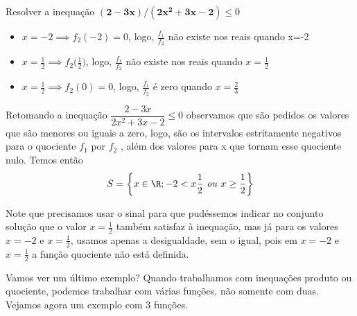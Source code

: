 \begin{example}{Resolver a inequação $\bm{(2-3x)/(2x^2+3x-2)}\leq0$}
\begin{itemize}
\item $x=-2\implies f_2(-2)=0$, logo, $\frac{f_1}{f_2}$ não existe nos reais quando x=-2
\item $x=\frac{1}{2}\implies f_2\big(\frac{1}{2}\big)$, logo, $\frac{f_1}{f_2}$ não existe nos reais quando $x=\frac{1}{2}$
\item $x=\frac{1}{2}\implies f_2(0) = 0$, logo, $\frac{f_1}{f_2}$ é zero quando $x=\frac{2}{3}$
\end{itemize}

Retomando a inequação $\dfrac{2-3x}{2x^2+3x-2}\leq 0$ observamos que são pedidos os valores que são menores ou iguais a zero, logo, são os intervalos estritamente negativos para o quociente $f_1$ por $f_2$  , além dos valores para x que tornam esse quociente nulo. Temos então 
\begin{equation*}
S=\left\{x\in\R;-2<x\frac{1}{2}\text{ \textit{ou} }x\geq\frac{1}{2}\right\}
\end{equation*}
\end{example}

\begin{observation}{}
Note que precisamos usar o sinal   para que pudéssemos indicar no conjunto solução que o valor $x=\frac{1}{2}$ também satisfaz à inequação, mas já para os valores $x=-2$ e $x=\frac{1}{2}$, usamos apenas a desigualdade, sem o igual, pois em $x=-2$ e $x=\frac{1}{2}$ a função quociente não está definida.
\end{observation}

Vamos ver um  último exemplo? Quando trabalhamos com inequações produto ou quociente, podemos trabalhar com várias funções, não somente com duas. Vejamos agora um exemplo com $3$ funções.

